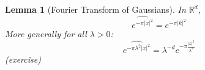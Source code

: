 \documentclass{report}
\theoremstyle{tommy}
\newtheorem{lem}[defn]{Lemma}
\newtheorem{rem}[defn]{Remark}
\newcommand{\Rd}{\mathbb{R}^d}
\begin{document}
  
  \begin{lem}[Fourier Transform of Gaussians] In \(\Rd\),
    \[\widehat{e^{- \pi |x|^2}} = e^{- \pi |k|^2}\]
    More generally for all \(\lambda > 0\):
    \[\widehat{e^{- \pi \lambda^2 |x|^2}} = \lambda^{-d} e^{-\pi \frac{|k|^2}{\lambda^2}}\]
    (exercise)
  \end{lem}
\end{document}
